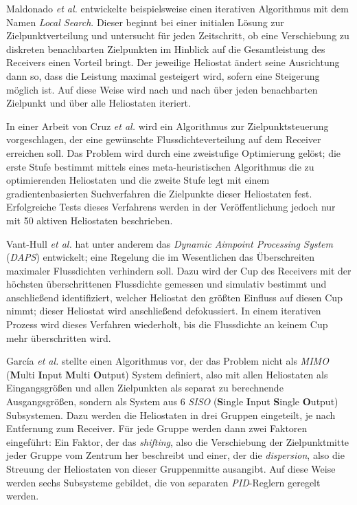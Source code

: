 Maldonado \textit{et al.} \cite{Maldonado}\cite{Maldonado2} entwickelte beispielsweise einen iterativen Algorithmus mit dem Namen \textit{Local Search}.
Dieser beginnt bei einer initialen Lösung zur Zielpunktverteilung und untersucht für jeden Zeitschritt, ob eine Verschiebung zu diskreten benachbarten Zielpunkten im Hinblick auf die Gesamtleistung des Receivers einen Vorteil bringt.
Der jeweilige Heliostat ändert seine Ausrichtung dann so, dass die Leistung maximal gesteigert wird, sofern eine Steigerung möglich ist.
Auf diese Weise wird nach und nach über jeden benachbarten Zielpunkt und über alle Heliostaten iteriert.

In einer Arbeit von Cruz \textit{et al.} \cite{Cruz} wird ein Algorithmus zur Zielpunktsteuerung vorgeschlagen, der eine gewünschte Flussdichteverteilung auf dem Receiver erreichen soll.
Das Problem wird durch eine zweistufige Optimierung gelöst; die erste Stufe bestimmt mittels eines meta-heuristischen Algorithmus die zu optimierenden Heliostaten und die zweite Stufe legt mit einem gradientenbasierten Suchverfahren die Zielpunkte dieser Heliostaten fest. Erfolgreiche Tests dieses Verfahrens werden in der Veröffentlichung jedoch nur mit 50 aktiven Heliostaten beschrieben.


Vant-Hull \textit{et al.} \cite{VantHull2}\cite{VantHull3} hat unter anderem das \textit{Dynamic Aimpoint Processing System} (\textit{DAPS}) entwickelt; eine Regelung die im Wesentlichen das Überschreiten maximaler Flussdichten verhindern soll.
Dazu wird der Cup des Receivers mit der höchsten überschrittenen Flussdichte gemessen und simulativ bestimmt und anschließend identifiziert, welcher Heliostat den größten Einfluss auf diesen Cup nimmt; dieser Heliostat wird anschließend defokussiert.
In einem iterativen Prozess wird dieses Verfahren wiederholt, bis die Flussdichte an keinem Cup mehr überschritten wird.

García \textit{et al.} \cite{Garcia1} stellte einen Algorithmus vor, der das Problem nicht als \textit{MIMO} (\textbf{M}ulti \textbf{I}nput \textbf{M}ulti \textbf{O}utput) System definiert, also mit allen Heliostaten als Eingangsgrößen und allen Zielpunkten als separat zu berechnende Ausgangsgrößen, sondern als System aus 6 \textit{SISO} (\textbf{S}ingle \textbf{I}nput \textbf{S}ingle \textbf{O}utput) Subsystemen.
Dazu werden die Heliostaten in drei Gruppen eingeteilt, je nach Entfernung zum Receiver.
Für jede Gruppe werden dann zwei Faktoren eingeführt: Ein Faktor, der das \textit{shifting}, also die Verschiebung der Zielpunktmitte jeder Gruppe vom Zentrum her beschreibt und einer, der die \textit{dispersion}, also die Streuung der Heliostaten von dieser Gruppenmitte ausangibt.
Auf diese Weise werden sechs Subsysteme gebildet, die von separaten \textit{PID}-Reglern geregelt werden.

